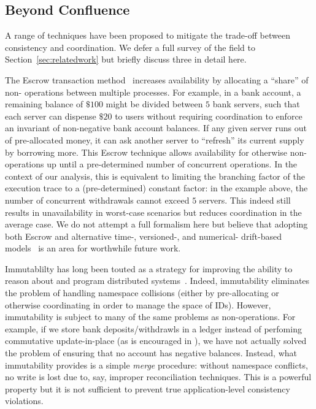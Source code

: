 
\subsection{Beyond Confluence}

A range of techniques have been proposed to mitigate the trade-off
between consistency and coordination. We defer a full survey of the
field to Section~\ref{sec:relatedwork} but briefly discuss three in
detail here.

 The Escrow transaction method~\cite{escrow}
increases availability by allocating a ``share'' of non-\iconfluent
operations between multiple processes. For example, in a bank account,
a remaining balance of $\$100$ might be divided between $5$ bank
servers, such that each server can dispense $\$20$ to users without
requiring coordination to enforce an invariant of non-negative bank
account balances. If any given server runs out of pre-allocated money,
it can ask another server to ``refresh'' its current supply by
borrowing more. This Escrow technique allows availability for
otherwise non-\iconfluent operations up until a pre-determined number
of concurrent operations. In the context of our \cfreedom analysis,
this is equivalent to limiting the branching factor of the execution
trace to a (pre-determined) constant factor: in the example above, the
number of concurrent withdrawals cannot exceed $5$ servers. This
indeed still results in unavailability in worst-case scenarios but
reduces coordination in the average case. We do not attempt a full
formalism here but believe that adopting both Escrow and alternative
time-, versioned-, and numerical- drift-based models~\cite{yu-conit}
is an area for worthwhile future work.

 Immutablilty has long been touted as a
strategy for improving the ability to reason about and program
distributed systems~\cite{helland-immutable,gray-virtues}. Indeed,
immutability eliminates the problem of handling namespace collisions
(either by pre-allocating or otherwise coordinating in order to manage
the space of IDs). However, immutability is subject to many of the
same problems as non-\iconfluent operations. For example, if we store
bank deposits/withdrawls in a ledger instead of perfoming commutative
update-in-place (as is encouraged in \lang), we have not actually
solved the problem of ensuring that no account has negative
balances. Instead, what immutability provides is a simple
\textit{merge} procedure: without namespace conflicts, no write is
lost due to, say, improper reconciliation techniques. This is a
powerful property but it is not sufficient to prevent true
application-level consistency violations.

